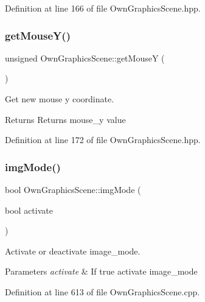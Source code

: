 Definition at line 166 of file Own\+Graphics\+Scene.\+hpp.

\mbox{\label{classOwnGraphicsScene_a3fd2942e9930fc2dda41844622dc8a35}} 
\subsubsection{\texorpdfstring{get\+Mouse\+Y()}{getMouseY()}}
{\footnotesize\ttfamily unsigned Own\+Graphics\+Scene\+::get\+MouseY (\begin{DoxyParamCaption}{ }\end{DoxyParamCaption})\hspace{0.3cm}{\ttfamily [inline]}}



Get new mouse y coordinate. 

\begin{DoxyReturn}{Returns}
Returns mouse\+\_\+y value 
\end{DoxyReturn}


Definition at line 172 of file Own\+Graphics\+Scene.\+hpp.

\mbox{\label{classOwnGraphicsScene_acc6e7978a3f10889e439ceabd155a341}} 
\subsubsection{\texorpdfstring{img\+Mode()}{imgMode()}}
{\footnotesize\ttfamily bool Own\+Graphics\+Scene\+::img\+Mode (\begin{DoxyParamCaption}\item[{bool}]{activate }\end{DoxyParamCaption})}



Activate or deactivate image\+\_\+mode. 


\begin{DoxyParams}{Parameters}
{\em activate} & If true activate image\+\_\+mode \\
\hline
\end{DoxyParams}


Definition at line 613 of file Own\+Graphics\+Scene.\+cpp.

